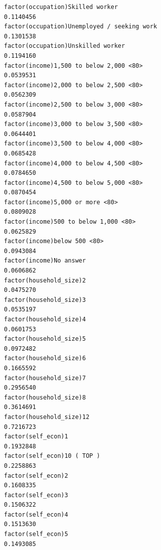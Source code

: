 \documentclass[
]{article}
\begin{document}
\begin{table}
\begin{minipage}[t]{\linewidth}
{\begin{verbatim}
factor(occupation)Skilled worker                                                   0.1140456
factor(occupation)Unemployed / seeking work                                        0.1301538
factor(occupation)Unskilled worker                                                 0.1194160
factor(income)1,500 to below 2,000 <80>                                            0.0539531
factor(income)2,000 to below 2,500 <80>                                            0.0562309
factor(income)2,500 to below 3,000 <80>                                            0.0587904
factor(income)3,000 to below 3,500 <80>                                            0.0644401
factor(income)3,500 to below 4,000 <80>                                            0.0685428
factor(income)4,000 to below 4,500 <80>                                            0.0784650
factor(income)4,500 to below 5,000 <80>                                            0.0870454
factor(income)5,000 or more <80>                                                   0.0809028
factor(income)500 to below 1,000 <80>                                              0.0625829
factor(income)below 500 <80>                                                       0.0943084
factor(income)No answer                                                            0.0606862
factor(household_size)2                                                            0.0475270
factor(household_size)3                                                            0.0535197
factor(household_size)4                                                            0.0601753
factor(household_size)5                                                            0.0972482
factor(household_size)6                                                            0.1665592
factor(household_size)7                                                            0.2956540
factor(household_size)8                                                            0.3614691
factor(household_size)12                                                           0.7216723
factor(self_econ)1                                                                 0.1932848
factor(self_econ)10 ( TOP )                                                        0.2258863
factor(self_econ)2                                                                 0.1608335
factor(self_econ)3                                                                 0.1506322
factor(self_econ)4                                                                 0.1513630
factor(self_econ)5                                                                 0.1493085

\end{verbatim}}
\end{minipage}
\end{table}
\end{document}
